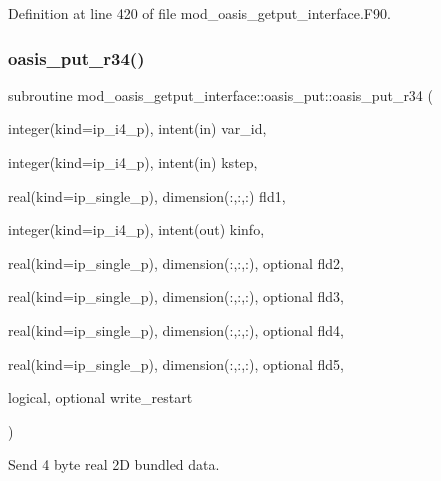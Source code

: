 Definition at line 420 of file mod\+\_\+oasis\+\_\+getput\+\_\+interface.\+F90.

\mbox{\label{interfacemod__oasis__getput__interface_1_1oasis__put_a58fd29713950ff380f847bbb88cdca2b}} 
\subsubsection{\texorpdfstring{oasis\+\_\+put\+\_\+r34()}{oasis\_put\_r34()}}
{\footnotesize\ttfamily subroutine mod\+\_\+oasis\+\_\+getput\+\_\+interface\+::oasis\+\_\+put\+::oasis\+\_\+put\+\_\+r34 (\begin{DoxyParamCaption}\item[{integer(kind=ip\+\_\+i4\+\_\+p), intent(in)}]{var\+\_\+id,  }\item[{integer(kind=ip\+\_\+i4\+\_\+p), intent(in)}]{kstep,  }\item[{real(kind=ip\+\_\+single\+\_\+p), dimension(\+:,\+:,\+:)}]{fld1,  }\item[{integer(kind=ip\+\_\+i4\+\_\+p), intent(out)}]{kinfo,  }\item[{real(kind=ip\+\_\+single\+\_\+p), dimension(\+:,\+:,\+:), optional}]{fld2,  }\item[{real(kind=ip\+\_\+single\+\_\+p), dimension(\+:,\+:,\+:), optional}]{fld3,  }\item[{real(kind=ip\+\_\+single\+\_\+p), dimension(\+:,\+:,\+:), optional}]{fld4,  }\item[{real(kind=ip\+\_\+single\+\_\+p), dimension(\+:,\+:,\+:), optional}]{fld5,  }\item[{logical, optional}]{write\+\_\+restart }\end{DoxyParamCaption})\hspace{0.3cm}{\ttfamily [private]}}



Send 4 byte real 2D bundled data. 



